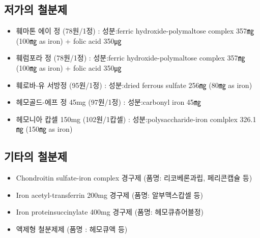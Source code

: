 \subsection{저가의 철분제}
\begin{itemize}\tightlist
\item 훼마톤 에이 정 (78원/1정) : 성분:ferric hydroxide-polymaltose complex 357㎎ (100㎎ as iron) + folic acid 350㎍ \\
\item 훼럼포라 정 (78원/1정) : 성분:ferric hydroxide-polymaltose complex 357㎎ (100㎎ as iron) + folic acid 350㎍ \\
\item 훼로바-유 서방정 (95원/1정) : 성분:dried ferrous sulfate 256㎎ (80㎎ as iron) \\
\item 헤모골드-에프 정 45mg (97원/1정) : 성분:carbonyl iron 45㎎\\
\item 헤모니아 캅셀 150mg (102원/1캅셀) : 성분:polysaccharide-iron comlplex 326.1㎎ (150㎎ as iron) \\
\end{itemize}

\subsection{기타의 철분제}
\begin{itemize}\tightlist
\item Chondroitin sulfate-iron complex 경구제 (품명: 리코베론과립, 페리콘캡슐 등) \\
\item Iron acetyl-transferrin 200mg 경구제 (품명: 알부맥스캅셀 등) \\
\item Iron proteinsuccinylate 400mg 경구제 (품명: 헤모큐츄어블정) \\
\item 액제형 철분제제 (품명 : 헤모큐액 등) \\
\end{itemize}

